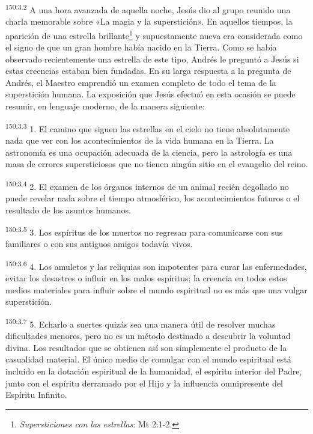 \par 
\textsuperscript{150:3.2} A una hora avanzada de aquella noche, Jesús dio al grupo reunido una charla memorable sobre «La magia y la superstición». En aquellos tiempos, la aparición de una estrella brillante\footnote{\textit{Supersticiones con las estrellas}: Mt 2:1-2.} y supuestamente nueva era considerada como el signo de que un gran hombre había nacido en la Tierra. Como se había observado recientemente una estrella de este tipo, Andrés le preguntó a Jesús si estas creencias estaban bien fundadas. En su larga respuesta a la pregunta de Andrés, el Maestro emprendió un examen completo de todo el tema de la superstición humana. La exposición que Jesús efectuó en esta ocasión se puede resumir, en lenguaje moderno, de la manera siguiente:

\par 
\textsuperscript{150:3.3} 1. El camino que siguen las estrellas en el cielo no tiene absolutamente nada que ver con los acontecimientos de la vida humana en la Tierra. La astronomía es una ocupación adecuada de la ciencia, pero la astrología es una masa de errores supersticiosos que no tienen ningún sitio en el evangelio del reino.

\par 
\textsuperscript{150:3.4} 2. El examen de los órganos internos de un animal recién degollado no puede revelar nada sobre el tiempo atmosférico, los acontecimientos futuros o el resultado de los asuntos humanos.

\par 
\textsuperscript{150:3.5} 3. Los espíritus de los muertos no regresan para comunicarse con sus familiares o con sus antiguos amigos todavía vivos.

\par 
\textsuperscript{150:3.6} 4. Los amuletos y las reliquias son impotentes para curar las enfermedades, evitar los desastres o influir en los malos espíritus; la creencia en todos estos medios materiales para influir sobre el mundo espiritual no es más que una vulgar superstición.

\par 
\textsuperscript{150:3.7} 5. Echarlo a suertes quizás sea una manera útil de resolver muchas dificultades menores, pero no es un método destinado a descubrir la voluntad divina. Los resultados que se obtienen así son simplemente el producto de la casualidad material. El único medio de comulgar con el mundo espiritual está incluido en la dotación espiritual de la humanidad, el espíritu interior del Padre, junto con el espíritu derramado por el Hijo y la influencia omnipresente del Espíritu Infinito.

